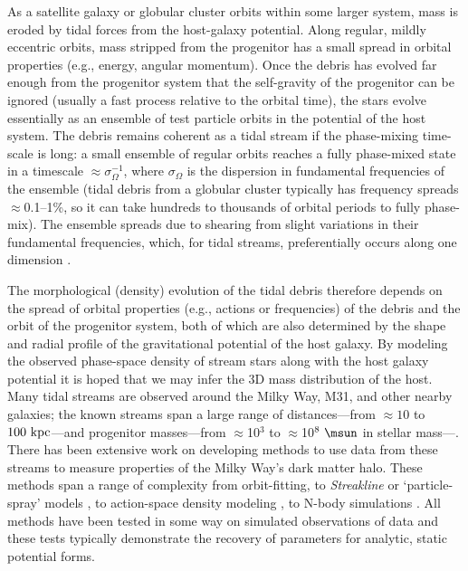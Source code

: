 As a satellite galaxy or globular cluster orbits within some larger system, mass
is eroded by tidal forces from the host-galaxy potential. Along regular, mildly
eccentric orbits, mass stripped from the progenitor has a small spread in
orbital properties (e.g., energy, angular momentum). Once the debris has evolved
far enough from the progenitor system that the self-gravity of the progenitor
can be ignored (usually a fast process relative to the orbital time), the stars
evolve essentially as an ensemble of test particle orbits in the potential of
the host system. The debris remains coherent as a tidal stream if the
phase-mixing time-scale is long: a small ensemble of regular orbits reaches a
fully phase-mixed state in a timescale $\approx\sigma_\Omega^{-1}$, where
$\sigma_\Omega$ is the dispersion in fundamental frequencies of the ensemble
(tidal debris from a globular cluster typically has frequency spreads
$\approx$0.1--1\%, so it can take hundreds to thousands of orbital periods to
fully phase-mix). The ensemble spreads due to shearing from slight variations in
their fundamental frequencies, which, for tidal streams, preferentially occurs
along one dimension \citep{merritt96, helmi99}.

The morphological (density) evolution of the tidal debris therefore depends on
the spread of orbital properties (e.g., actions or frequencies) of the debris
and the orbit of the progenitor system, both of which are also determined by the
shape and radial profile of the gravitational potential of the host galaxy. By
modeling the observed phase-space density of stream stars along with the host
galaxy potential it is hoped that we may infer the 3D mass distribution of the
host. Many tidal streams are observed around the Milky Way, M31, and other
nearby galaxies; the known streams span a large range of distances---from
$\approx10$ to $100~{\rm kpc}$---and progenitor masses---from $\approx$10$^3$ to
$\approx$10$^8~\msun$ in stellar mass---\citep[][]{ibata94,odenkirchen01,belokur
ov06,grillmair06a,grillmair06b,bonaca12}. There has been extensive work on
developing methods to use data from these streams to measure properties of the
Milky Way's dark matter halo. These methods span a range of complexity from
orbit-fitting, to \emph{Streakline} \citep{kuepper12} or `particle-spray' models
\citep{gibbons14}, to action-space density modeling \citep[e.g.,][]{sanders14,
bovy14}, to N-body simulations \citep[e.g.,][]{law10}. All methods have been
tested in some way on simulated observations of data and these tests typically
demonstrate the recovery of parameters for analytic, static potential forms.

